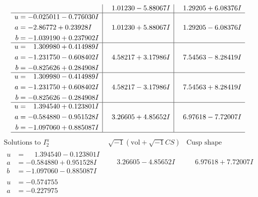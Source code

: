 \documentclass[1p]{elsarticle_modified}
\theoremstyle{definition}
\newcommand{\I}{\sqrt{-1}}
\begin{document}
$$\begin{array}{c|c|c}
 & \phantom{-}1.01230 - 5.88067 I & \phantom{-}1.29205 + 6.08376 I \\ \hline\begin{aligned}
u &= -0.025011 - 0.776030 I \\
a &= -2.86772 + 0.23928 I \\
b &= -1.039190 + 0.237902 I\end{aligned}
 & \phantom{-}1.01230 + 5.88067 I & \phantom{-}1.29205 - 6.08376 I \\ \hline\begin{aligned}
u &= \phantom{-}1.309980 + 0.414989 I \\
a &= -1.231750 - 0.608402 I \\
b &= -0.825626 + 0.284908 I\end{aligned}
 & \phantom{-}4.58217 + 3.17986 I & \phantom{-}7.54563 - 8.28419 I \\ \hline\begin{aligned}
u &= \phantom{-}1.309980 - 0.414989 I \\
a &= -1.231750 + 0.608402 I \\
b &= -0.825626 - 0.284908 I\end{aligned}
 & \phantom{-}4.58217 - 3.17986 I & \phantom{-}7.54563 + 8.28419 I \\ \hline\begin{aligned}
u &= \phantom{-}1.394540 + 0.123801 I \\
a &= -0.584880 - 0.951528 I \\
b &= -1.097060 + 0.885087 I\end{aligned}
 & \phantom{-}3.26605 + 4.85652 I & \phantom{-}6.97618 - 7.72007 I\\
 \hline 
 \end{array}$$\newpage$$\begin{array}{c|c|c}  
\text{Solutions to }I^u_{2}& \I (\text{vol} + \sqrt{-1}CS) & \text{Cusp shape}\\
 \hline 
\begin{aligned}
u &= \phantom{-}1.394540 - 0.123801 I \\
a &= -0.584880 + 0.951528 I \\
b &= -1.097060 - 0.885087 I\end{aligned}
 & \phantom{-}3.26605 - 4.85652 I & \phantom{-}6.97618 + 7.72007 I \\ \hline\begin{aligned}
u &= -0.574755\phantom{ +0.000000I} \\
a &= -0.227975\phantom{ +0.000000I} \\

\end{aligned}
\end{array}$$
\end{document}
